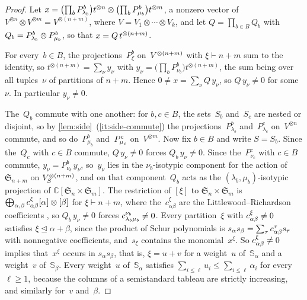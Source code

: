 \documentclass[11pt,letterpaper]{article}
\newcommand{\CC}{\mathbb{C}}
\begin{document}
\begin{proof}
Let $x = \bigl( \prod_b P^b_{\smash{\lambda_{b}}} \bigr) t^{\otimes n} \otimes \bigl( \prod_b P^b_{\smash{\mu_{b}}} \bigr) t^{\otimes m}$, a nonzero vector of $V^{\otimes n} \otimes V^{\otimes m} = V^{\otimes (n+m)}$, where $V = V_1 \otimes \cdots \otimes V_k$, and let $Q = \prod_{b \in B} Q_b$ with $Q_b = P^b_{\smash{\lambda_{b}}} \otimes P^b_{\smash{\mu_{b}}}$, so that $x = Q\, t^{\smash{\otimes (n+m)}}$.

For every~$b \in B$, the projections~$P^b_\xi$ on~$V^{\smash{\otimes (n+m)}}$ with $\xi \vdash n+m$ sum to the identity, so $t^{\otimes (n+m)} = \sum_{\nu} y_{\nu}$ with $y_{\nu} = \bigl( \prod_b P^b_{\nu_{b}} \bigr) t^{\otimes (n+m)}$, the sum being over all tuples~$\nu$ of partitions of $n+m$. Hence $0 \neq x = \sum_{\nu} Q\, y_{\nu}$, so $Q\, y_{\nu} \neq 0$ for some~$\nu$. In particular $y_{\nu} \neq 0$.

The~$Q_b$ commute with one another: for $b, c \in B$, the sets~$S_b$ and~$S_c$ are nested or disjoint, so by \cref{lem:side}~(\ref{it:side-commute}) the projections~$P^b_{\lambda_b}$ and~$P^c_{\lambda_c}$ on~$V^{\otimes n}$ commute, and so do~$P^b_{\mu_b}$ and~$P^c_{\smash{\mu_c}}$ on~$V^{\otimes m}$. Now fix $b \in B$ and write $S = S_b$. Since the~$Q_c$ with $c \in B$ commute, $Q\, y_{\nu} \neq 0$ forces $Q_b\, y_{\nu} \neq 0$. Since the~$P^c_{\nu_c}$ with $c \in B$ commute, $y_{\nu} = P^b_{\nu_b}\, y_{\nu}$, so~$y_{\nu}$ lies in the $\nu_{b}$-isotypic component for the action of $\mathfrak{S}_{n+m}$ on $V_S^{\smash{\otimes (n+m)}}$, and on that component~$Q_b$ acts as the $(\lambda_{b}, \mu_{b})$-isotypic projection of $\CC[\mathfrak{S}_n \times \mathfrak{S}_m]$. The restriction of $[\xi]$ to $\mathfrak{S}_n \times \mathfrak{S}_m$ is $\bigoplus_{\alpha, \beta} c^{\smash[t]{\xi}}_{\alpha \beta} [\alpha] \otimes [\beta]$ for $\xi \vdash n+m$, where the~$c^{\xi}_{\alpha \beta}$ are the Littlewood--Richardson coefficients \cite[Exercise~4.43]{MR1153249}, so $Q_b\, y_{\nu} \neq 0$ forces $c^{\smash[t]{\nu_b}}_{\lambda_b \mu_b} \neq 0$. Every partition~$\xi$ with $c^{\smash[t]{\xi}}_{\alpha\beta} \neq 0$ satisfies $\xi \unlhd \alpha + \beta$, since the product of Schur polynomials is $s_\alpha s_\beta = \sum_\tau c^\tau_{\smash[b]{\alpha\beta}} s_\tau$ with nonnegative coefficients, and~$s_\xi$ contains the monomial~$x^\xi$. So $c^{\smash[t]{\xi}}_{\alpha\beta} \neq 0$ implies that~$x^\xi$ occurs in $s_\alpha s_\beta$, that is, $\xi = u + v$ for a weight~$u$ of~$\mathbb{S}_\alpha$ and a weight~$v$ of~$\mathbb{S}_\beta$. Every weight~$u$ of~$\mathbb{S}_\alpha$ satisfies $\sum_{i \leq \ell} u_i \leq \sum_{i \leq \ell} \alpha_i$ for every $\ell \geq 1$, because the columns of a semistandard tableau are strictly increasing, and similarly for~$v$ and~$\beta$.
\end{proof}
\end{document}
